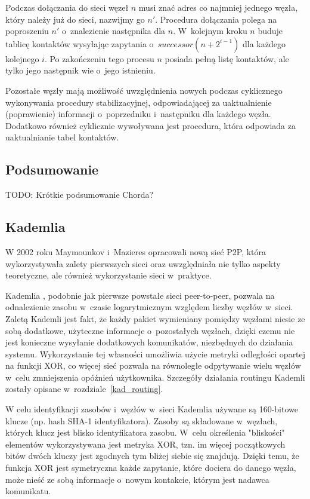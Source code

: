 \documentclass[a4paper,11pt]{scrartcl}
\begin{document}
Podczas dołączania do sieci węzeł $n$ musi znać adres co najmniej jednego węzła, który należy już do sieci, nazwijmy go $n'$. Procedura dołączania polega na poproszeniu $n'$ o~znalezienie następnika dla $n$. W~kolejnym kroku $n$ buduje tablicę kontaktów wysyłając zapytania o~$successor(n + 2^{i-1})$ dla każdego kolejnego $i$. Po zakończeniu tego procesu $n$ posiada pełną listę kontaktów, ale tylko jego następnik wie o~jego istnieniu.

Pozostałe węzły mają możliwość uwzględnienia nowych podczas cyklicznego wykonywania procedury stabilizacyjnej, odpowiadającej za uaktualnienie (poprawienie) informacji o~poprzedniku i~następniku dla każdego węzła. Dodatkowo również cyklicznie wywoływana jest procedura, która odpowiada za uaktualnianie tabel kontaktów.

\subsection{Podsumowanie}
TODO: Krótkie podsumowanie Chorda?


\subsection{Kademlia}
W 2002 roku Maymounkov i~Mazieres opracowali nową sieć P2P, która wykorzystywała zalety pierwszych sieci oraz uwzględniała nie tylko aspekty teoretyczne, ale również wykorzystanie sieci w~praktyce.

Kademlia \cite{maymounkov2002kademlia}, podobnie jak pierwsze powstałe sieci peer-to-peer, pozwala na odnalezienie zasobu w~czasie logarytmicznym względem liczby węzłów w~sieci. Zaletą Kademli jest fakt, że każdy pakiet wymieniany pomiędzy węzłami niesie ze sobą dodatkowe, użyteczne informacje o~pozostałych węzłach, dzięki czemu nie jest konieczne wysyłanie dodatkowych komunikatów, niezbędnych do działania systemu. Wykorzystanie tej własności umożliwia użycie metryki odległości opartej na funkcji XOR, co więcej sieć pozwala na równoległe odpytywanie wielu węzłów w~celu zmniejszenia opóźnień użytkownika. Szczegóły działania routingu Kademli zostały opisane w~rozdziale~\ref{kad_routing}.

W celu identyfikacji zasobów i~węzłów w~sieci Kademlia używane są 160-bitowe klucze (np. hash SHA-1 identyfikatora). Zasoby są składowane w~węzłach, których klucz jest blisko identyfikatora zasobu. W~celu określenia "bliskości" elementów wykorzystywana jest metryka XOR, tzn. im więcej początkowych bitów dwóch kluczy jest zgodnych tym bliżej siebie się znajdują. Dzięki temu, że funkcja XOR jest symetryczna każde zapytanie, które dociera do danego węzła, może nieść ze sobą informacje o~nowym kontakcie, którym jest nadawca komunikatu.
\end{document}

